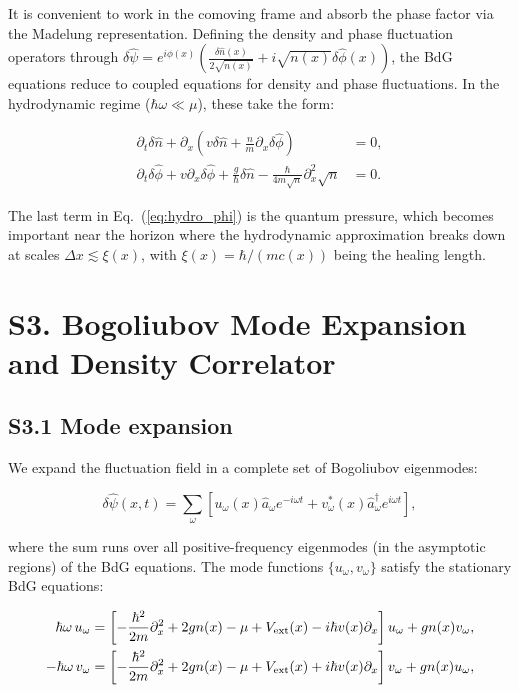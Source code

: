 \documentclass[prd,aps,showpacs,superscriptaddress,twocolumn]{revtex4-2}
\begin{document}
It is convenient to work in the comoving frame and absorb the phase factor via the Madelung representation. Defining the density and phase fluctuation operators through $\delta\hat{\psi} = e^{i\phi(x)} \left( \frac{\delta\hat{n}(x)}{2\sqrt{n(x)}} + i \sqrt{n(x)} \delta\hat{\phi}(x) \right)$, the BdG equations reduce to coupled equations for density and phase fluctuations. In the hydrodynamic regime ($\hbar \omega \ll \mu$), these take the form:

\begin{align}
\partial_t \delta\hat{n} + \partial_x\left( v \delta\hat{n} + \frac{n}{m} \partial_x \delta\hat{\phi} \right) &= 0, \label{eq:hydro_n}\\
\partial_t \delta\hat{\phi} + v \partial_x \delta\hat{\phi} + \frac{g}{\hbar} \delta\hat{n} - \frac{\hbar}{4m\sqrt{n}} \partial_x^2 \sqrt{n} &= 0. \label{eq:hydro_phi}
\end{align}

The last term in Eq.~(\ref{eq:hydro_phi}) is the quantum pressure, which becomes important near the horizon where the hydrodynamic approximation breaks down at scales $\Delta x \lesssim \xi(x)$, with $\xi(x) = \hbar/(m c(x))$ being the healing length.

\section{S3. Bogoliubov Mode Expansion and Density Correlator}

\subsection{S3.1 Mode expansion}

We expand the fluctuation field in a complete set of Bogoliubov eigenmodes:

\begin{equation}
\delta\hat{\psi}(x,t) = \sum_\omega \left[ u_\omega(x) \hat{a}_\omega e^{-i\omega t} + v_\omega^*(x) \hat{a}_\omega^\dagger e^{i\omega t} \right],
\label{eq:mode_expansion}
\end{equation}

where the sum runs over all positive-frequency eigenmodes (in the asymptotic regions) of the BdG equations. The mode functions $\{u_\omega, v_\omega\}$ satisfy the stationary BdG equations:

\begin{align}
\hbar\omega \, u_\omega &= \left[ -\frac{\hbar^2}{2m} \partial_x^2 + 2g n(x) - \mu + V_{\rm ext}(x) - i\hbar v(x) \partial_x \right] u_\omega + g n(x) v_\omega, \label{eq:BdG_u}\\
-\hbar\omega \, v_\omega &= \left[ -\frac{\hbar^2}{2m} \partial_x^2 + 2g n(x) - \mu + V_{\rm ext}(x) + i\hbar v(x) \partial_x \right] v_\omega + g n(x) u_\omega, \label{eq:BdG_v}
\end{align}
\end{document}
